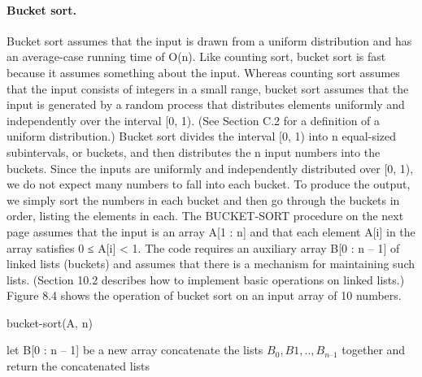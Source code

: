 \paragraph{Bucket sort.}
Bucket sort assumes that the input is drawn from a uniform distribution and has an average-case running time of O(n). Like counting sort, bucket sort is fast because it assumes something about the input. Whereas counting sort assumes that the input consists of integers in a small range, bucket sort assumes that the input is generated by a random process that distributes elements uniformly and independently over the interval [0, 1). (See Section C.2 for a definition of a uniform distribution.)
Bucket sort divides the interval [0, 1) into n equal-sized subintervals, or buckets, and then distributes the n input numbers into the buckets. Since the inputs are uniformly and independently distributed over [0, 1), we do not expect many numbers to fall into each bucket. To produce the output, we simply sort the numbers in each bucket and then go through the buckets in order, listing the elements in each.
The BUCKET-SORT procedure on the next page assumes that the input is an array A[1 : n] and that each element A[i] in the array satisfies 0 ≤ A[i] < 1. The code requires an auxiliary array B[0 : n – 1] of linked lists (buckets) and assumes that there is a mechanism for maintaining such lists. (Section 10.2 describes how to implement basic operations on linked lists.) Figure 8.4 shows the operation of bucket sort on an input array of 10 numbers.

\begin{algbox}{bucket-sort(A, n)}
  \begin{algorithm}[H]
    	let B[0 : n – 1] be a new array
	\For{ $i \leftarrow [1, n]$}{
	    insert $A_{i}$ into list $B_{ \lfloor n A_{i} \rfloor} ]$
       	}
	concatenate the lists $B_{0}, B{1}, .. , B_{n – 1}$ together and\\
	return the concatenated lists
  \end{algorithm}
\end{algbox}




